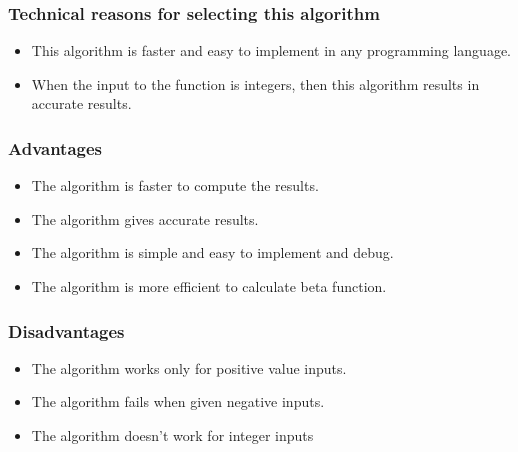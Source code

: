 \documentclass[12pt]{report}
\begin{document}
\subsubsection{Technical reasons for selecting this algorithm}
\begin{itemize}
    \item This algorithm is faster and easy to implement in any programming language.
    \item When the input to the function is integers, then this algorithm results in accurate results.
\end{itemize}

\subsubsection{Advantages}
\begin{itemize}
\item The algorithm is faster to compute the results.
\item The algorithm gives accurate results.
\item The algorithm is simple and easy to implement and debug.
\item The algorithm is more efficient to calculate beta function.
\end{itemize}

\subsubsection{Disadvantages}
\begin{itemize}
\item The algorithm works only for positive value inputs.
\item The algorithm fails when given negative inputs.
\item The algorithm doesn't work for integer inputs
\end{itemize}
\end{document}
